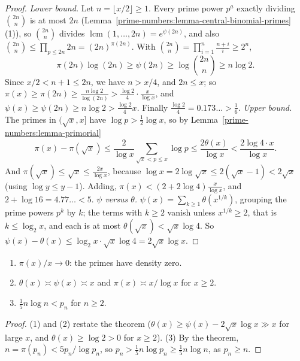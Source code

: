 \begin{proof}
\emph{Lower bound.} Let $n = \lfloor x/2\rfloor \geq 1$. Every prime power $p^a$ exactly dividing $\binom{2n}{n}$ is at most $2n$ (Lemma~\ref{prime-numbers:lemma-central-binomial-primes}(1)), so
$\binom{2n}{n}$ divides $\operatorname{lcm}(1, \ldots, 2n) = e^{\psi(2n)}$, and also $\binom{2n}{n} \leq \prod_{p \leq 2n}2n = (2n)^{\pi(2n)}$. With $\binom{2n}{n} = \prod_{i=1}^{n}\frac{n + i}{i} \geq 2^n$,
\[
\pi(2n)\log(2n) \geq \psi(2n) \geq \log\binom{2n}{n} \geq n\log 2.
\]
Since $x/2 < n + 1 \leq 2n$, we have $n > x/4$, and $2n \leq x$; so $\pi(x) \geq \pi(2n) \geq \frac{n\log 2}{\log(2n)} > \frac{\log 2}{4}\cdot\frac{x}{\log x}$, and $\psi(x) \geq \psi(2n) \geq n\log 2 >
\frac{\log 2}{4}x$. Finally $\frac{\log 2}{4} = 0.173\ldots > \frac16$.
\emph{Upper bound.} The primes in $(\sqrt{x}, x]$ have $\log p > \frac12\log x$, so by Lemma~\ref{prime-numbers:lemma-primorial}
\[
\pi(x) - \pi(\sqrt{x}) \leq \frac{2}{\log x}\sum_{\sqrt{x} < p \leq x}\log p \leq \frac{2\theta(x)}{\log x} < \frac{2\log 4 \cdot x}{\log x}.
\]
And $\pi(\sqrt{x}) \leq \sqrt{x} \leq \frac{2x}{\log x}$, because $\log x = 2\log\sqrt{x} \leq 2(\sqrt{x} - 1) < 2\sqrt{x}$ (using $\log y \leq y - 1$). Adding, $\pi(x) < (2 + 2\log 4)\frac{x}{\log x}$, and
$2 + \log 16 = 4.77\ldots < 5$.
\emph{$\psi$ versus $\theta$.} $\psi(x) = \sum_{k \geq 1}\theta(x^{1/k})$, grouping the prime powers $p^k$ by $k$; the terms with $k \geq 2$ vanish unless $x^{1/k} \geq 2$, that is
$k \leq \log_2x$, and each is at most $\theta(\sqrt{x}) < \sqrt{x}\log 4$. So $\psi(x) - \theta(x) \leq \log_2 x \cdot \sqrt{x}\log 4 = 2\sqrt{x}\log x$.
\end{proof}

\begin{corollary}\label{prime-numbers:corollary-chebyshev}
\begin{enumerate}
\item $\pi(x)/x \to 0$: the primes have density zero.
\item $\theta(x) \asymp \psi(x) \asymp x$ and $\pi(x) \asymp x/\log x$ for $x \geq 2$.
\item $\frac15 n\log n < p_n$ for $n \geq 2$.
\end{enumerate}
\end{corollary}

\begin{proof}
(1) and (2) restate the theorem ($\theta(x) \geq \psi(x) - 2\sqrt{x}\log x \gg x$ for large $x$, and $\theta(x) \geq \log 2 > 0$ for $x \geq 2$). (3) By the theorem, $n = \pi(p_n) < 5p_n/\log p_n$, so
$p_n > \frac15 n\log p_n \geq \frac15 n\log n$, as $p_n \geq n$.
\end{proof}

